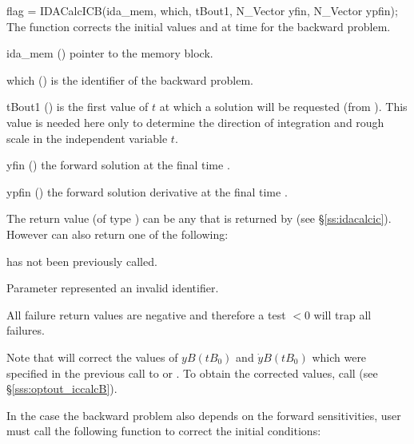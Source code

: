 {
  flag = IDACalcICB(ida\_mem, which, tBout1, N\_Vector yfin, N\_Vector ypfin);
}
{
  The function  corrects the initial values  and  at
  time  for the backward problem.
}
{
  \begin{args}
  \item[ida\_mem] ()
    pointer to the {\idas} memory block.
  \item[which] ()
    is the identifier of the backward problem.
  \item[tBout1] ()
    is the first value of $t$ at which a solution will be requested (from
    ). This value is needed here only to determine the direction of
    integration and rough scale in the independent variable $t$.   
  \item[yfin] ()
    the forward solution at the final time .
  \item[ypfin] ()
    the forward solution derivative at the final time .
  \end{args}
}
{
  The return value  (of type ) can be any that is returned by 
   (see \S\ref{ss:idacalcic}). However  can also 
  return one of the following:

  \begin{args}
  \item[\Id{IDA\_NO\_ADJ}]
     has not been previously called.
  \item[\id{IDA\_ILL\_INPUT}]
    Parameter  represented an invalid identifier.
  \end{args}
}
{
  All failure return values are negative and therefore a test  $< 0$
  will trap all  failures.

  Note that  will correct the values of $yB(tB_0)$ and 
  $\dot{y}B(tB_0)$ which were specified in the previous call to  
  or . To obtain the corrected values, call 
   (see \S\ref{sss:optout_iccalcB}).
}

In the case the backward problem also depends on the forward sensitivities, 
user must call the following function to correct the initial conditions:

